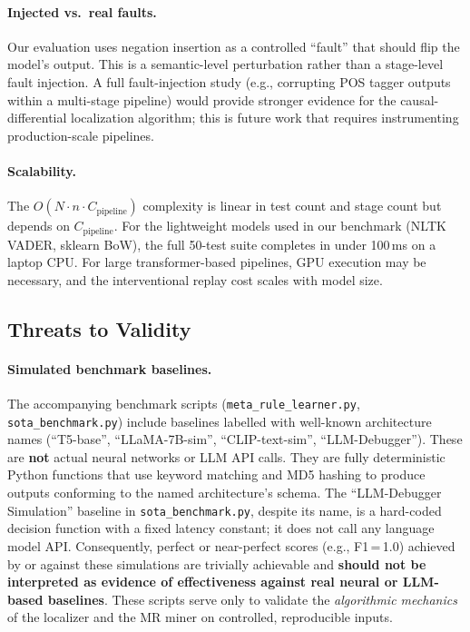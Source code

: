 \documentclass[sigconf,nonacm]{acmart}
\begin{document}
\paragraph{Injected vs.\ real faults.}
Our evaluation uses negation insertion as a controlled ``fault'' that should flip the model's output.
This is a semantic-level perturbation rather than a stage-level fault injection.
A full fault-injection study (e.g., corrupting POS tagger outputs within a multi-stage pipeline) would provide stronger evidence for the causal-differential localization algorithm; this is future work that requires instrumenting production-scale pipelines.

\paragraph{Scalability.}
The $O(N \cdot n \cdot C_{\mathrm{pipeline}})$ complexity is linear in test count and stage count but depends on $C_{\mathrm{pipeline}}$.
For the lightweight models used in our benchmark (NLTK VADER, sklearn BoW), the full 50-test suite completes in under 100\,ms on a laptop CPU\@.
For large transformer-based pipelines, GPU execution may be necessary, and the interventional replay cost scales with model size.

\subsection{Threats to Validity}\label{sec:threats}

\paragraph{Simulated benchmark baselines.}
The accompanying benchmark scripts (\texttt{meta\_rule\_learner.py}, \texttt{sota\_benchmark.py}) include baselines labelled with well-known architecture names (``T5-base'', ``LLaMA-7B-sim'', ``CLIP-text-sim'', ``LLM-Debugger'').
These are \textbf{not} actual neural networks or LLM API calls.
They are fully deterministic Python functions that use keyword matching and MD5 hashing to produce outputs conforming to the named architecture's schema.
The ``LLM-Debugger Simulation'' baseline in \texttt{sota\_benchmark.py}, despite its name, is a hard-coded decision function with a fixed latency constant; it does not call any language model API.
Consequently, perfect or near-perfect scores (e.g., F1\,=\,1.0) achieved by or against these simulations are trivially achievable and \textbf{should not be interpreted as evidence of effectiveness against real neural or LLM-based baselines}.
These scripts serve only to validate the \emph{algorithmic mechanics} of the localizer and the MR miner on controlled, reproducible inputs.
\end{document}
